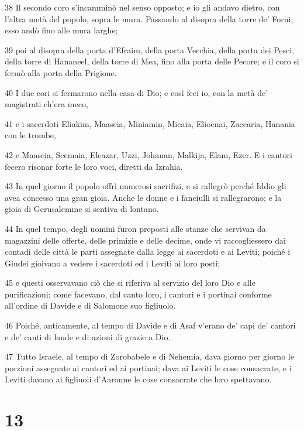 \par 38 Il secondo coro s'incamminò nel senso opposto; e io gli andavo dietro, con l'altra metà del popolo, sopra le mura. Passando al disopra della torre de' Forni, esso andò fino alle mura larghe;
\par 39 poi al disopra della porta d'Efraim, della porta Vecchia, della porta dei Pesci, della torre di Hananeel, della torre di Mea, fino alla porta delle Pecore; e il coro si fermò alla porta della Prigione.
\par 40 I due cori si fermarono nella casa di Dio; e così feci io, con la metà de' magistrati ch'era meco,
\par 41 e i sacerdoti Eliakim, Maaseia, Miniamin, Micaia, Elioenai, Zaccaria, Hanania con le trombe,
\par 42 e Maaseia, Scemaia, Eleazar, Uzzi, Johanan, Malkija, Elam, Ezer. E i cantori fecero risonar forte le loro voci, diretti da Izrahia.
\par 43 In quel giorno il popolo offrì numerosi sacrifizi, e si rallegrò perché Iddio gli avea concesso una gran gioia. Anche le donne e i fanciulli si rallegrarono; e la gioia di Gerusalemme si sentiva di lontano.
\par 44 In quel tempo, degli uomini furon preposti alle stanze che servivan da magazzini delle offerte, delle primizie e delle decime, onde vi raccogliessero dai contadi delle città le parti assegnate dalla legge ai sacerdoti e ai Leviti; poiché i Giudei gioivano a vedere i sacerdoti ed i Leviti ai loro posti;
\par 45 e questi osservavano ciò che si riferiva al servizio del loro Dio e alle purificazioni; come facevano, dal canto loro, i cantori e i portinai conforme all'ordine di Davide e di Salomone suo figliuolo.
\par 46 Poiché, anticamente, al tempo di Davide e di Asaf v'erano de' capi de' cantori e de' canti di laude e di azioni di grazie a Dio.
\par 47 Tutto Israele, al tempo di Zorobabele e di Nehemia, dava giorno per giorno le porzioni assegnate ai cantori ed ai portinai; dava ai Leviti le cose consacrate, e i Leviti davano ai figliuoli d'Aaronne le cose consacrate che loro spettavano.

\chapter{13}

